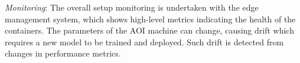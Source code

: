 \textit{Monitoring}: The overall setup monitoring is undertaken with the edge management system, which shows high-level metrics indicating the health of the containers. The parameters of the AOI machine can change, causing drift which requires a new model to be trained and deployed. Such drift is detected from changes in performance metrics.
